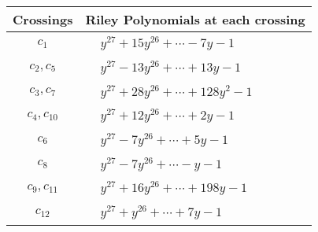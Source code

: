 \documentclass[1p]{elsarticle_modified}
\theoremstyle{definition}
\begin{document}
\begin{tabular}{m{50pt}|m{274pt}}
Crossings & \hspace{64pt}Riley Polynomials at each crossing \\
\hline $$\begin{aligned}c_{1}\end{aligned}$$&$\begin{aligned}
&y^{27}+15 y^{26}+\cdots-7 y-1
\end{aligned}$\\
\hline $$\begin{aligned}c_{2},c_{5}\end{aligned}$$&$\begin{aligned}
&y^{27}-13 y^{26}+\cdots+13 y-1
\end{aligned}$\\
\hline $$\begin{aligned}c_{3},c_{7}\end{aligned}$$&$\begin{aligned}
&y^{27}+28 y^{26}+\cdots+128 y^2-1
\end{aligned}$\\
\hline $$\begin{aligned}c_{4},c_{10}\end{aligned}$$&$\begin{aligned}
&y^{27}+12 y^{26}+\cdots+2 y-1
\end{aligned}$\\
\hline $$\begin{aligned}c_{6}\end{aligned}$$&$\begin{aligned}
&y^{27}-7 y^{26}+\cdots+5 y-1
\end{aligned}$\\
\hline $$\begin{aligned}c_{8}\end{aligned}$$&$\begin{aligned}
&y^{27}-7 y^{26}+\cdots- y-1
\end{aligned}$\\
\hline $$\begin{aligned}c_{9},c_{11}\end{aligned}$$&$\begin{aligned}
&y^{27}+16 y^{26}+\cdots+198 y-1
\end{aligned}$\\
\hline $$\begin{aligned}c_{12}\end{aligned}$$&$\begin{aligned}
&y^{27}+y^{26}+\cdots+7 y-1
\end{aligned}$\\
\hline
\end{tabular}\\~\\
\end{document}
